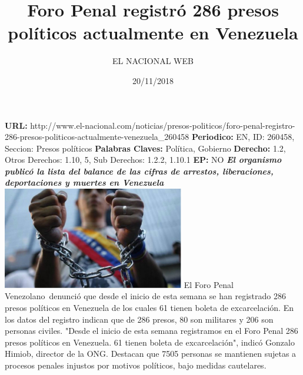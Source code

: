 \documentclass{article}%
\title{\textbf{Foro Penal registró 286 presos políticos actualmente en Venezuela}}%
\author{EL NACIONAL WEB}%
\date{20/11/2018}%
\begin{document}
%
\normalsize%
\maketitle%
\textbf{URL: }%
http://www.el{-}nacional.com/noticias/presos{-}politicos/foro{-}penal{-}registro{-}286{-}presos{-}politicos{-}actualmente{-}venezuela\_260458\newline%
%
\textbf{Periodico: }%
EN, %
ID: %
260458, %
Seccion: %
Presos políticos\newline%
%
\textbf{Palabras Claves: }%
Política, Gobierno\newline%
%
\textbf{Derecho: }%
1.2, %
Otros Derechos: %
1.10, 5, %
Sub Derechos: %
1.2.2, 1.10.1\newline%
%
\textbf{EP: }%
NO\newline%
\newline%
%
\textbf{\textit{El organismo publicó la lista del balance de las cifras de arrestos, liberaciones, deportaciones y muertes en Venezuela}}%
\newline%
\newline%
%
\includegraphics[width=300px]{195.jpg}%
\newline%
%
El Foro Penal Venezolano~denunció que desde el inicio de esta semana se han registrado 286 presos políticos en Venezuela de los cuales 61 tienen boleta de excarcelación.%
\newline%
%
En los datos del registro indican que de 286 presos, 80 son militares y 206 son personas civiles. "Desde el inicio de esta semana registramos en el Foro Penal 286 presos políticos en Venezuela. 61 tienen boleta de excarcelación", indicó Gonzalo Himiob, director de la ONG.%
\newline%
%
Destacan que 7505 personas se mantienen sujetas a procesos penales injustos por motivos políticos, bajo medidas cautelares.%
\newline%
%
\end{document}
